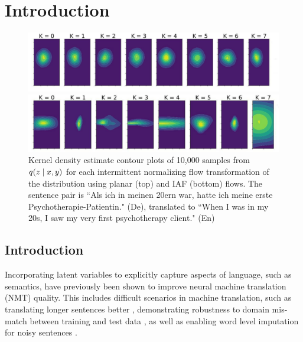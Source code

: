 
\chapter{Introduction}
\label{ch:Introduction}

\begin{figure}[ht]
	\vskip 0.2in
	\begin{center}
		\centerline{\includegraphics[width=\columnwidth]{planar_flows_plot_edited.pdf}}
		\centerline{\includegraphics[width=\columnwidth]{iaf_flows_plot_edited.pdf}}
		\caption{Kernel density estimate contour plots of 10,000 samples from $q(z \; | \;{x, y})$ for each intermittent normalizing flow transformation of the distribution using planar (top) and IAF (bottom) flows. The sentence pair is ``Als ich in meinen 20ern war, hatte ich meine erste Psychotherapie-Patientin." (De), translated to ``When I was in my 20s, I saw my very first psychotherapy client." (En)}
		\label{flowsplot}
	\end{center}
	\vskip -0.2in
	\vspace{-4mm}
\end{figure}

\section{Introduction}

Incorporating latent variables to explicitly capture aspects of language, such as semantics, have previously been shown to improve neural machine translation (NMT) quality. This includes difficult scenarios in machine translation, such as translating longer sentences better \cite{Zhang2016VNMT, harshil2018GNMT, Su2018VRNMT}, demonstrating robustness to domain mis-match between training and test data \cite{eikema2018AEVNMT}, as well as enabling word level imputation for noisy sentences \cite{harshil2018GNMT}. 

